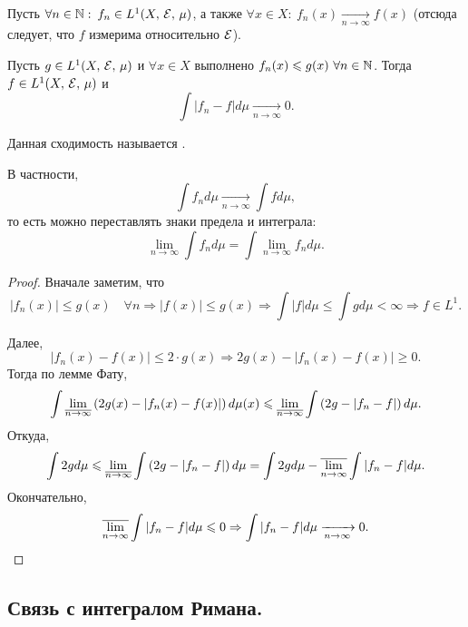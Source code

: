 \begin{theorem}
    Пусть $\forall n\in\mathbb{N}:\: f_n\in L^1(X,\, \mathcal{E},\, \mu)$, а также
    $\forall x\in X:\: f_n(x)\xrightarrow[n\to\infty]{} f(x)$ (отсюда следует, что $f$ измерима относительно $\mathcal{E}$).

    Пусть $g\in L^1(X,\, \mathcal{E},\, \mu)$ и $\forall x \in X$
    выполнено $f_n(x)\leqslant g(x)\ \forall n\in\mathbb{N}$.
    Тогда $f\in L^1(X,\, \mathcal{E},\, \mu)$ и \[
        \int |f_n-f|d\mu\xrightarrow[n\to\infty]{}0.
    \]

    \begin{remark}
        Данная сходимость называется .
    \end{remark}

    \begin{next0}
        В частности, \[
            \int f_nd\mu\xrightarrow[n\to\infty]{}\int fd\mu,
        \]
        то есть можно переставлять знаки предела и интеграла:\[
            \lim_{n\to\infty}\int f_nd\mu=\int\lim_{n\to\infty}f_nd\mu.
        \]
    \end{next0}

    \begin{proof}

        Вначале заметим, что \[
            |f_n(x)|\leqslant g(x)\quad\forall n\Rightarrow|f(x)|\leqslant g(x)\Rightarrow
            \int |f|d\mu\leqslant\int gd\mu<\infty\Rightarrow f\in L^1.
        \]

        Далее, \[
            |f_n(x)-f(x)|\leqslant 2\cdot g(x)\Rightarrow 2g(x)-|f_n(x)-f(x)|\geqslant 0.
        \]
        Тогда по лемме Фату, \[
            \int \lim_{\overline{n\to\infty}}\left(2g(x)-|f_n(x)-f(x)|\right)d\mu(x)
            \leqslant \lim_{\overline{n\to\infty}}\int \left(2g-|f_n-f|\right)d\mu.
        \]
        Откуда, \[
            \int 2gd\mu\leqslant\lim_{\overline{n\to\infty}}\int \left(2g-|f_n-f|\right)d\mu=
            \int 2gd\mu-\overline{\lim_{n\to\infty}}\int |f_n-f|d\mu.
        \]
        Окончательно, \[
            \overline{\lim_{n\to\infty}}\int |f_n-f|d\mu\leqslant 0\Rightarrow
            \int |f_n-f|d\mu\xrightarrow[n\to\infty]{}0.
        \]

    \end{proof}
\end{theorem}

\subsection{Связь с интегралом Римана.}

